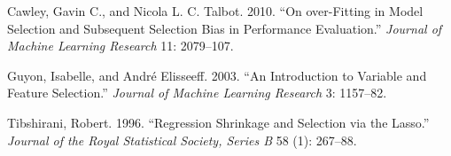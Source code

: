 \rujukanheading

\protect{}\label{refs}
\begin{CSLReferences}{1}{1}
Cawley, Gavin C., and Nicola L. C. Talbot. 2010. {``On over-Fitting in Model Selection and Subsequent Selection Bias in Performance Evaluation.''} \emph{Journal of Machine Learning Research} 11: 2079--107.

Guyon, Isabelle, and André Elisseeff. 2003. {``An Introduction to Variable and Feature Selection.''} \emph{Journal of Machine Learning Research} 3: 1157--82.

Tibshirani, Robert. 1996. {``Regression Shrinkage and Selection via the Lasso.''} \emph{Journal of the Royal Statistical Society, Series B} 58 (1): 267--88.

\end{CSLReferences}
